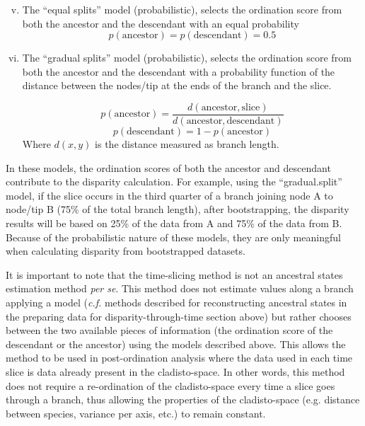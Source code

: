 \documentclass[12pt,a4paper]{article}
\begin{document}
\begin{enumerate}
    \begin{enumerate}[(i)]
    \setcounter{enumii}{4}
      \item The ``equal splits'' model (probabilistic), selects the ordination score from both the ancestor and the descendant with an equal probability
          \begin{equation}
          p(\text{ancestor}) = p(\text{descendant}) = 0.5
          \end{equation}

    \item The ``gradual splits'' model (probabilistic), selects the ordination score from both the ancestor and the descendant with a probability function of the distance between the nodes/tip at the ends of the branch and the slice.

          \begin{equation}
              p(\text{ancestor}) = \frac{d(\text{ancestor},\text{slice})}{d(\text{ancestor},\text{descendant})}
          \end{equation}
          \begin{equation}
              p(\text{descendant}) = 1 - p(\text{ancestor})
          \end{equation}
    \noindent Where $d(x,y)$ is the distance measured as branch length.
    \end{enumerate}

    In these models, the ordination scores of both the ancestor and descendant contribute to the disparity calculation.
    For example, using the ``gradual.split'' model, if the slice occurs in the third quarter of a branch joining node A to node/tip B (75\% of the total branch length), after bootstrapping, the disparity results will be based on 25\% of the data from A and 75\% of the data from B.
    Because of the probabilistic nature of these models, they are only meaningful when calculating disparity from bootstrapped datasets.
\end{enumerate}

It is important to note that the time-slicing method is not an ancestral states estimation method \textit{per se}.
This method does not estimate values along a branch applying a model (\textit{c.f.} methods described for reconstructing ancestral states in the preparing data for disparity-through-time section above) but rather chooses between the two available pieces of information (the ordination score of the descendant or the ancestor) using the models described above.
This allows the method to be used in post-ordination analysis where the data used in each time slice is data already present in the cladisto-space.
In other words, this method does not require a re-ordination of the cladisto-space every time a slice goes through a branch, thus allowing the properties of the cladisto-space (e.g. distance between species, variance per axis, etc.) to remain constant.
 
\end{document}
